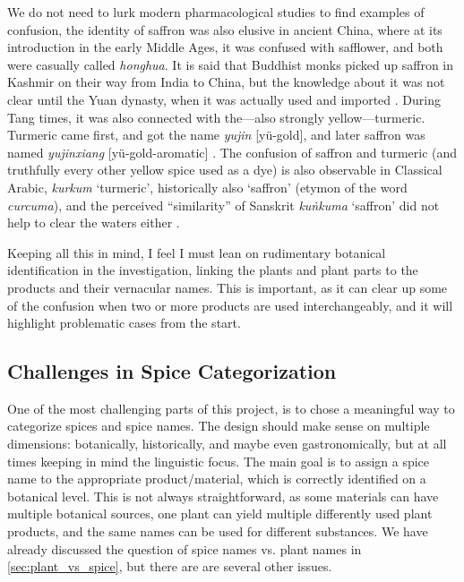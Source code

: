 We do not need to lurk modern pharmacological studies to find examples of confusion, the identity of saffron was also elusive in ancient China, where at its introduction in the early Middle Ages, it was confused with safflower, and both were casually called  \textit{honghua}. It is said that Buddhist monks picked up saffron in Kashmir on their way from India to China, but the knowledge about it was not clear until the Yuan dynasty, when it was actually used and imported \autocite{laufer_sino-iranica_1919}. During Tang times, it was also connected with the---also strongly yellow---turmeric. Turmeric came first, and got the name  \textit{yujin} [yü-gold], and later saffron was named  \textit{yujinxiang} [yü-gold-aromatic] \autocite{schafer_golden_1985}. The confusion of saffron and turmeric (and truthfully every other yellow spice used as a dye) is also observable in Classical Arabic, \textit{kurkum} `turmeric', historically also `saffron' (etymon of the word \textit{curcuma}), and the perceived ``similarity'' of Sanskrit  \textit{kuṅkuma} `saffron' did not help to clear the waters either \autocite[see]{guthrie_trade-language_2009}.

Keeping all this in mind, I feel I must lean on rudimentary botanical identification in the investigation, linking the plants and plant parts to the products and their vernacular names. This is important, as it can clear up some of the confusion when two or more products are used interchangeably, and it will highlight problematic cases from the start.

\subsection{Challenges in Spice Categorization}

One of the most challenging parts of this project, is to chose a meaningful way to categorize spices and spice names. The design should make sense on multiple dimensions: botanically, historically, and maybe even gastronomically, but at all times keeping in mind the linguistic focus. The main goal is to assign a spice name to the appropriate product/material, which is correctly identified on a botanical level. This is not always straightforward, as some materials can have multiple botanical sources, one plant can yield multiple differently used plant products, and the same names can be used for different substances. We have already discussed the question of spice names vs. plant names in \cref{sec:plant_vs_spice}, but there are are several other issues.

